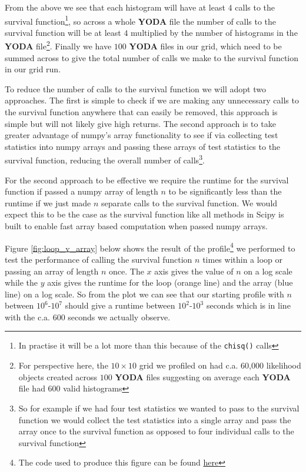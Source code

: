 From the above we see that each histogram will have at least $4$ calls to the survival function\footnote{In practise it will be a lot more than this because of the \texttt{chisq()} calls}, so across a whole \textbf{YODA} file the number of calls to the survival function will be at least $4$ multiplied by the number of histograms in the \textbf{YODA} file\footnote{For perspective here, the $10\times 10$ grid we profiled on had c.a. 60,000 likelihood objects created across $100$ \textbf{YODA} files suggesting on average each \textbf{YODA} file had $600$ valid histograms}. Finally we have $100$ \textbf{YODA} files in our grid, which need to be summed across to give the total number of calls we make to the survival function in our grid run.

To reduce the number of calls to the survival function we will adopt two approaches. The first is simple to check if we are making any unnecessary calls to the survival function anywhere that can easily be removed, this approach is simple but will not likely give high returns. The second approach is to take greater advantage of numpy's array functionality to see if via collecting test statistics into numpy arrays and passing these arrays of test statistics to the survival function, reducing the overall number of calls\footnote{So for example if we had four test statistics we wanted to pass to the survival function we would collect the test statistics into a single array and pass the array once to the survival function as opposed to four individual calls to the survival function}.

For the second approach to be effective we require the runtime for the survival function if passed a numpy array of length $n$ to be significantly less than the runtime if we just made $n$ separate calls to the survival function. We would expect this to be the case as the survival function like all methods in Scipy is built to enable fast array based computation when passed numpy arrays. 

Figure \ref{fig:loop_v_array} below shows the result of the profile\footnote{The code used to produce this figure can be found \href{https://github.com/SeanBrayUCL/contur_thesis/tree/main/profiling_code}{here}} we performed to test the performance of calling the survival function $n$ times within a loop or passing an array of length $n$ once. The $x$ axis gives the value of $n$ on a log scale while the $y$ axis gives the runtime for the loop (orange line) and the array (blue line) on a log scale. So from the plot we can see that our starting profile with $n$ between $10^6$-$10^7$ should give a runtime between $10^2$-$10^3$ seconds which is in line with the c.a. $600$ seconds we actually observe.

